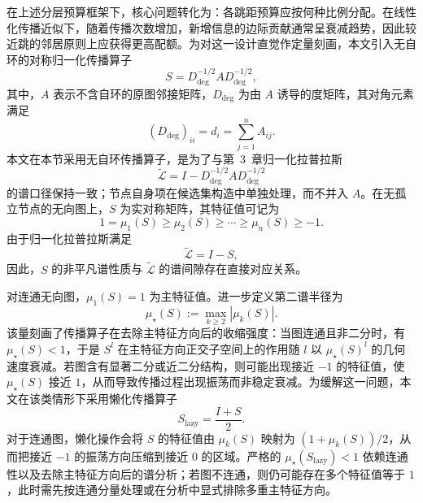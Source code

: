 在上述分层预算框架下，核心问题转化为：各跳距预算应按何种比例分配。在线性化传播近似下，随着传播次数增加，新增信息的边际贡献通常呈衰减趋势，因此较近跳的邻居原则上应获得更高配额。为对这一设计直觉作定量刻画，本文引入无自环的对称归一化传播算子
\begin{equation}
  S = D_{\deg}^{-1/2} A D_{\deg}^{-1/2},
  \label{eq:ch4-propagator}
\end{equation}
其中，\(A\) 表示不含自环的原图邻接矩阵，\(D_{\deg}\) 为由 \(A\) 诱导的度矩阵，其对角元素满足
\begin{equation}
  (D_{\deg})_{ii}=d_i=\sum_{j=1}^{n}A_{ij}.
  \label{eq:ch4-degree-matrix}
\end{equation}
本文在本节采用无自环传播算子，是为了与第~3~章归一化拉普拉斯
\begin{equation}
  \tilde{\mathcal{L}} = I - D_{\deg}^{-1/2} A D_{\deg}^{-1/2}
  \label{eq:ch4-laplacian-propagator}
\end{equation}
的谱口径保持一致；节点自身项在候选集构造中单独处理，而不并入 \(A\)。在无孤立节点的无向图上，\(S\) 为实对称矩阵，其特征值可记为
\begin{equation}
  1=\mu_1(S)\ge \mu_2(S)\ge \cdots \ge \mu_n(S)\ge -1.
  \label{eq:ch4-propagator-spectrum}
\end{equation}
由于归一化拉普拉斯满足
\begin{equation}
  \tilde{\mathcal{L}} = I - S,
  \label{eq:ch4-laplacian-s-relation}
\end{equation}
因此，\(S\) 的非平凡谱性质与 \(\tilde{\mathcal{L}}\) 的谱间隙存在直接对应关系。

对连通无向图，\(\mu_1(S)=1\) 为主特征值。进一步定义第二谱半径为
\begin{equation}
  \mu_\star(S) := \max_{k \geq 2} |\mu_k(S)|.
  \label{eq:ch4-mustar}
\end{equation}
该量刻画了传播算子在去除主特征方向后的收缩强度：当图连通且非二分时，有 \(\mu_\star(S)<1\)，于是 \(S^l\) 在主特征方向正交子空间上的作用随 \(l\) 以 \(\mu_\star(S)^l\) 的几何速度衰减。若图含有显著二分或近二分结构，则可能出现接近 \(-1\) 的特征值，使 \(\mu_\star(S)\) 接近 \(1\)，从而导致传播过程出现振荡而非稳定衰减。为缓解这一问题，本文在该类情形下采用懒化传播算子
\begin{equation}
  S_{\mathrm{lazy}}=\frac{I+S}{2}.
  \label{eq:ch4-slazy}
\end{equation}
对于连通图，懒化操作会将 \(S\) 的特征值由 \(\mu_k(S)\) 映射为 \((1+\mu_k(S))/2\)，从而把接近 \(-1\) 的振荡方向压缩到接近 \(0\) 的区域。严格的 \(\mu_\star(S_{\mathrm{lazy}})<1\) 依赖连通性以及去除主特征方向后的谱分析；若图不连通，则仍可能存在多个特征值等于 \(1\)，此时需先按连通分量处理或在分析中显式排除多重主特征方向。

